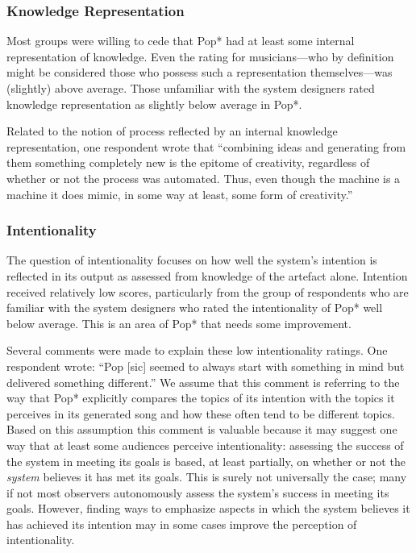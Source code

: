 \documentclass[phd,electronic,oneside,twosidetoc,letterpaper,chaptercenter,parttop,lof,lot]{byumsphd}
\begin{document}
\subsubsection{Knowledge Representation}

Most groups were willing to cede that Pop* had at least some internal representation of knowledge. Even the rating for musicians---who by definition might be considered those who possess such a representation themselves---was (slightly) above average. Those unfamiliar with the system designers rated knowledge representation as slightly below average in Pop*.

Related to the notion of process reflected by an internal knowledge representation, one respondent wrote that ``combining ideas and generating from them something completely new is the epitome of creativity, regardless of whether or not the process was automated.  Thus, even though the machine is a machine it does mimic, in some way at least, some form of creativity.''

\subsubsection{Intentionality}

The question of intentionality focuses on how well the system's intention is reflected in its output as assessed from knowledge of the artefact alone. Intention received relatively low scores, particularly from the group of respondents who are familiar with the system designers who rated the intentionality of Pop* well below average. This is an area of Pop* that needs some improvement.

Several comments were made to explain these low intentionality ratings. One respondent wrote: ``Pop [sic] seemed to always start with something in mind but delivered something different.'' We assume that this comment is referring to the way that Pop* explicitly compares the topics of its intention with the topics it perceives in its generated song and how these often tend to be different topics. Based on this assumption this comment is valuable because it may suggest one way that at least some audiences perceive intentionality: assessing the success of the system in meeting its goals is based, at least partially, on whether or not the \textit{system} believes it has met its goals. This is surely not universally the case; many if not most observers autonomously assess the system's success in meeting its goals. However, finding ways to emphasize aspects in which the system believes it has achieved its intention may in some cases improve the perception of intentionality.
\end{document}
